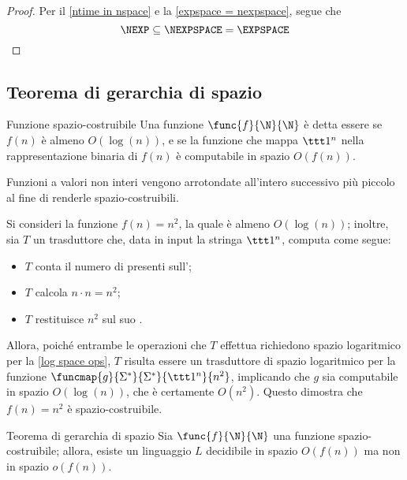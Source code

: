 \documentclass[a4paper, 12pt]{report}
\begin{document}
    \begin{proof}
        Per il \cref{ntime in nspace} e la \cref{expspace = nexpspace}, segue che $$\NEXP \subseteq \NEXPSPACE = \EXPSPACE$$
    \end{proof}

    \subsection{Teorema di gerarchia di spazio}
    
    \begin{frameddefn}{Funzione spazio-costruibile}
        Una funzione $\func{f}{\N}{\N}$ è detta essere  se $f(n)$ è almeno $O(\log(n))$, e se la funzione che mappa $\ttt 1^n$ nella rappresentazione binaria di $f(n)$ è computabile in spazio $O(f(n))$.

        Funzioni a valori non interi vengono arrotondate all'intero successivo più piccolo al fine di renderle spazio-costruibili.
    \end{frameddefn}

    \begin{example}
        Si consideri la funzione $f(n) = n^2$, la quale è almeno $O(\log(n))$; inoltre, sia $T$ un trasduttore che, data in input la stringa $\ttt 1 ^n$, computa come segue:

        \begin{itemize}
            \item $T$ conta il numero di  presenti sull';
            \item $T$ calcola $n \cdot n = n^2$;
            \item $T$ restituisce $n^2$ sul suo .
        \end{itemize}

        Allora, poiché entrambe le operazioni che $T$ effettua richiedono spazio logaritmico per la \cref{log space ops}, $T$ risulta essere un trasduttore di spazio logaritmico per la funzione $\funcmap{g}{\Sigma^*}{\Sigma^*}{\ttt 1^n}{n^2}$, implicando che $g$ sia computabile in spazio $O(\log(n))$, che è certamente $O(n^2)$. Questo dimostra che $f(n) = n^2$ è spazio-costruibile.
    \end{example}

    \begin{framedthm}[label={hier space thm}]{Teorema di gerarchia di spazio}
        Sia $\func{f}{\N}{\N}$ una funzione spazio-costruibile; allora, esiste un linguaggio $L$ decidibile in spazio $O(f(n))$ ma non in spazio $o(f(n))$.
    \end{framedthm}
\end{document}
